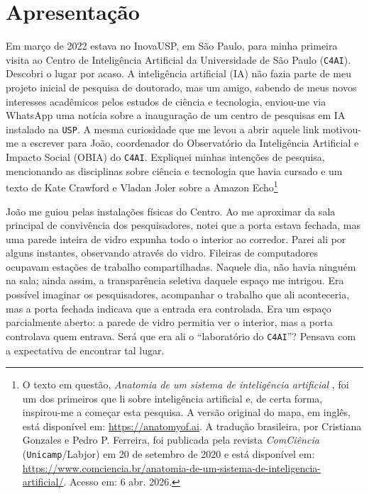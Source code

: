 \chapter*{Apresentação}

Em março de 2022 estava no InovaUSP, em São Paulo, para minha primeira visita ao Centro de Inteligência Artificial da Universidade de São Paulo (\texttt{C4AI}). Descobri o lugar por acaso. A inteligência artificial (IA) não fazia parte de meu projeto inicial de pesquisa de doutorado, mas um amigo, sabendo de meus novos interesses acadêmicos pelos estudos de ciência e tecnologia, enviou-me via WhatsApp uma notícia sobre a inauguração de um centro de pesquisas em IA instalado na \texttt{USP}. A mesma curiosidade que me levou a abrir aquele link motivou-me a escrever para João, coordenador do Observatório da Inteligência Artificial e Impacto Social (OBIA) do \texttt{C4AI}. Expliquei minhas intenções de pesquisa, mencionando as disciplinas sobre ciência e tecnologia que havia cursado e um texto de Kate Crawford e Vladan Joler sobre a Amazon Echo\footnote{O texto 
em questão, \emph{Anatomia de um sistema de inteligência artificial} \parencite{Crawford2018Anatomy}, foi um dos primeiros que li sobre  inteligência artificial e, de certa forma, inspirou-me a começar esta pesquisa. 
A versão original do mapa, em inglês, está disponível em: 
\url{https://anatomyof.ai}. A tradução brasileira, por Cristiana Gonzales 
e Pedro P. Ferreira, foi publicada pela revista \textit{ComCiência} 
(\texttt{Unicamp}/Labjor) em 20 de setembro de 2020 e está disponível em: 
\url{https://www.comciencia.br/anatomia-de-um-sistema-de-inteligencia-artificial/}. 
Acesso em: 6 abr. 2026.}

João me guiou pelas instalações físicas do Centro. Ao me aproximar da sala principal de convivência dos pesquisadores, notei que a porta estava fechada, mas uma parede inteira de vidro expunha todo o interior ao corredor. Parei ali por alguns instantes, observando através do vidro. Fileiras de computadores ocupavam estações de trabalho compartilhadas. Naquele dia, não havia ninguém na sala; ainda assim, a transparência seletiva daquele espaço me intrigou. Era possível imaginar os pesquisadores, acompanhar o trabalho que ali aconteceria, mas a porta fechada indicava que a entrada era controlada. Era um espaço parcialmente aberto: a parede de vidro permitia ver o interior, mas a porta controlava quem entrava. Será que era ali o ``laboratório do \texttt{C4AI}''? Pensava com a expectativa de encontrar tal lugar.

